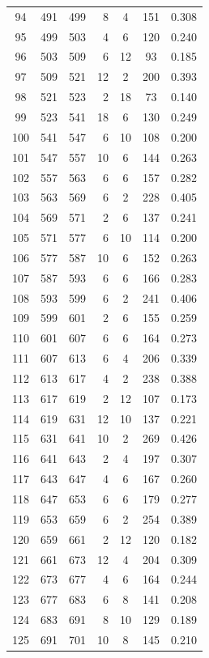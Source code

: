 \documentclass[12pt]{article}
\theoremstyle{plain}
\theoremstyle{definition}
\theoremstyle{remark}
\begin{document}
\begin{center}
\begin{small}
\begin{longtable}{@{}crrrccc@{}}
94 & 491 & 499 & 8 & 4 & 151 & 0.308 \\
95 & 499 & 503 & 4 & 6 & 120 & 0.240 \\
96 & 503 & 509 & 6 & 12 & 93 & 0.185 \\
97 & 509 & 521 & 12 & 2 & 200 & 0.393 \\
98 & 521 & 523 & 2 & 18 & 73 & 0.140 \\
99 & 523 & 541 & 18 & 6 & 130 & 0.249 \\
100 & 541 & 547 & 6 & 10 & 108 & 0.200 \\
101 & 547 & 557 & 10 & 6 & 144 & 0.263 \\
102 & 557 & 563 & 6 & 6 & 157 & 0.282 \\
103 & 563 & 569 & 6 & 2 & 228 & 0.405 \\
104 & 569 & 571 & 2 & 6 & 137 & 0.241 \\
105 & 571 & 577 & 6 & 10 & 114 & 0.200 \\
106 & 577 & 587 & 10 & 6 & 152 & 0.263 \\
107 & 587 & 593 & 6 & 6 & 166 & 0.283 \\
108 & 593 & 599 & 6 & 2 & 241 & 0.406 \\
109 & 599 & 601 & 2 & 6 & 155 & 0.259 \\
110 & 601 & 607 & 6 & 6 & 164 & 0.273 \\
111 & 607 & 613 & 6 & 4 & 206 & 0.339 \\
112 & 613 & 617 & 4 & 2 & 238 & 0.388 \\
113 & 617 & 619 & 2 & 12 & 107 & 0.173 \\
114 & 619 & 631 & 12 & 10 & 137 & 0.221 \\
115 & 631 & 641 & 10 & 2 & 269 & 0.426 \\
116 & 641 & 643 & 2 & 4 & 197 & 0.307 \\
117 & 643 & 647 & 4 & 6 & 167 & 0.260 \\
118 & 647 & 653 & 6 & 6 & 179 & 0.277 \\
119 & 653 & 659 & 6 & 2 & 254 & 0.389 \\
120 & 659 & 661 & 2 & 12 & 120 & 0.182 \\
121 & 661 & 673 & 12 & 4 & 204 & 0.309 \\
122 & 673 & 677 & 4 & 6 & 164 & 0.244 \\
123 & 677 & 683 & 6 & 8 & 141 & 0.208 \\
124 & 683 & 691 & 8 & 10 & 129 & 0.189 \\
125 & 691 & 701 & 10 & 8 & 145 & 0.210 \\

\end{longtable}
\end{small}
\end{center}
\end{document}

